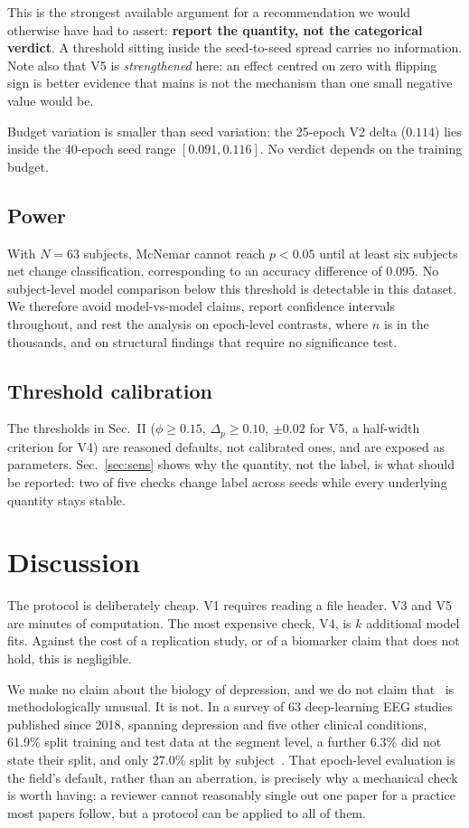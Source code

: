 \documentclass[10pt,conference]{IEEEtran}
\begin{document}
This is the strongest available argument for a recommendation we would otherwise
have had to assert: \textbf{report the quantity, not the categorical verdict}. A
threshold sitting inside the seed-to-seed spread carries no information. Note
also that V5 is \emph{strengthened} here: an effect centred on zero with flipping
sign is better evidence that mains is not the mechanism than one small negative
value would be.

Budget variation is smaller than seed variation: the 25-epoch V2 delta
($0.114$) lies inside the 40-epoch seed range $[0.091, 0.116]$. No verdict
depends on the training budget.

\subsection{Power}\label{sec:power}
With $N=63$ subjects, McNemar cannot reach $p<0.05$ until at least six subjects
net change classification, corresponding to an accuracy difference of $0.095$.
No subject-level model comparison below this threshold is detectable in this
dataset. We therefore avoid model-vs-model claims, report confidence intervals
throughout, and rest the analysis on epoch-level contrasts, where $n$ is in the
thousands, and on structural findings that require no significance test.

\subsection{Threshold calibration}
The thresholds in Sec.~II ($\phi\geq0.15$, $\Delta_p\geq0.10$, $\pm0.02$ for V5,
a half-width criterion for V4) are reasoned defaults, not calibrated ones, and
are exposed as parameters. Sec.~\ref{sec:sens} shows why the quantity, not the
label, is what should be reported: two of five checks change label across seeds
while every underlying quantity stays stable.

\section{Discussion}

The protocol is deliberately cheap. V1 requires reading a file header. V3 and V5
are minutes of computation. The most expensive check, V4, is $k$ additional model
fits. Against the cost of a replication study, or of a biomarker claim that does
not hold, this is negligible.

We make no claim about the biology of depression, and we do not claim
that~\cite{anik2024} is methodologically unusual. It is not. In a survey of 63
deep-learning EEG studies published since 2018, spanning depression and five
other clinical conditions, 61.9\% split training and test data at the segment
level, a further 6.3\% did not state their split, and only 27.0\% split by
subject~\cite{brookshire2024}. That epoch-level evaluation is the field's
default, rather than an aberration, is precisely why a mechanical check is worth
having: a reviewer cannot reasonably single out one paper for a practice most
papers follow, but a protocol can be applied to all of them.
\end{document}
